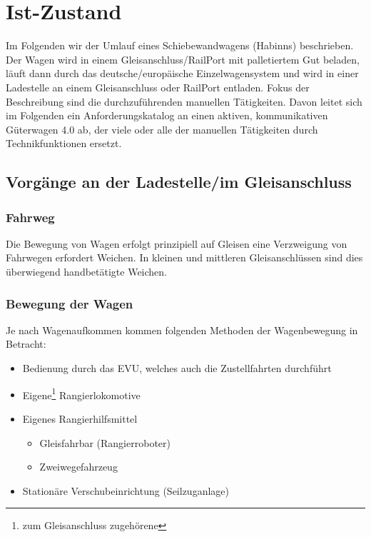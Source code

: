 \section{Ist-Zustand} %
Im Folgenden wir der Umlauf eines Schiebewandwagens (Habinns) beschrieben. Der Wagen wird in einem Gleisanschluss/RailPort mit palletiertem Gut beladen, läuft dann durch das deutsche/europäische Einzelwagensystem und wird in einer Ladestelle an einem Gleisanschluss oder RailPort entladen. Fokus der Beschreibung sind die durchzuführenden manuellen Tätigkeiten. Davon leitet sich im Folgenden ein Anforderungskatalog an einen aktiven, kommunikativen Güterwagen 4.0 ab, der viele oder alle der manuellen Tätigkeiten durch Technikfunktionen ersetzt.

\subsection{Vorgänge an der Ladestelle/im Gleisanschluss}
\subsubsection{Fahrweg} \label{sec:Fahrweg}
Die Bewegung von Wagen erfolgt prinzipiell auf Gleisen eine Verzweigung von Fahrwegen erfordert Weichen. In kleinen und mittleren Gleisanschlüssen sind dies überwiegend handbetätigte Weichen. 
\subsubsection{Bewegung der Wagen} \label{sec:BewdWagen}
Je nach Wagenaufkommen kommen folgenden Methoden der Wagenbewegung in Betracht:
\begin{itemize}
	\item Bedienung durch das EVU, welches auch die Zustellfahrten durchführt
	\item Eigene\footnote{zum Gleisanschluss zugehörene} Rangierlokomotive
	\item Eigenes Rangierhilfsmittel
	\begin{itemize}
	    \item Gleisfahrbar (Rangierroboter)
	    \item Zweiwegefahrzeug
	\end{itemize}
	\item Stationäre Verschubeinrichtung (Seilzuganlage)
\end{itemize}
